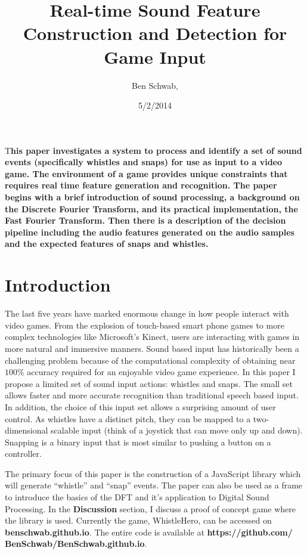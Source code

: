 \documentclass[DIV=calc, paper=a4, fontsize=11pt, twocolumn]{scrartcl}   %
\title{Real-time Sound Feature Construction and Detection for Game Input } %
\author{Ben Schwab, } %
\date{5/2/2014} %
\newcommand{\initial}[1]{ %
\lettrine[lines=3,lhang=0.3,nindent=0em]{
\color{DarkGoldenrod}
{\textsf{#1}}}{}}
\begin{document}
\maketitle %

\thispagestyle{fancy} %



\initial{T}\textbf{his paper investigates a system to process and identify a set of sound events (specifically whistles and snaps) for use as input to a video game. The environment of a game provides unique constraints that requires real time feature generation and recognition. The paper begins with a brief introduction of sound processing, a background on the Discrete Fourier Transform, and its practical implementation, the Fast Fourier Transform. Then there is a description of the decision pipeline including the audio features generated on the audio samples and the expected features of snaps and whistles.}

\tableofcontents

\section{Introduction}

\par The last five years have marked enormous change in how people interact with video games. From the explosion of touch-based smart phone games to more complex technologies like Microsoft's Kinect, users are interacting with games in more natural and immersive manners. Sound based input has historically been a challenging problem because of the computational complexity of obtaining near $100\%$ accuracy required for an enjoyable video game experience. In this paper I propose a limited set of sound input actions: whistles and snaps. The small set allows faster and more accurate recognition than traditional speech based input. In addition, the choice of this input set allows a surprising amount of user control. As whistles have a distinct pitch, they can be mapped to a two-dimensional scalable input (think of a joystick that can move only up and down). Snapping is a binary input that is most similar to pushing a button on a controller.
\par The primary focus of this paper is the construction of a JavaScript library which will generate ``whistle'' and ``snap'' events. The paper can also be used as a frame to introduce the basics of the DFT and it's application to Digital Sound Processing. In the \textbf{Discussion} section, I discuss a proof of concept game where the library is used. Currently the game, WhistleHero, can be accessed on \textbf{benschwab.github.io}. The entire code is available at \textbf{https://github.com/ BenSchwab/BenSchwab.github.io}.
\end{document}
